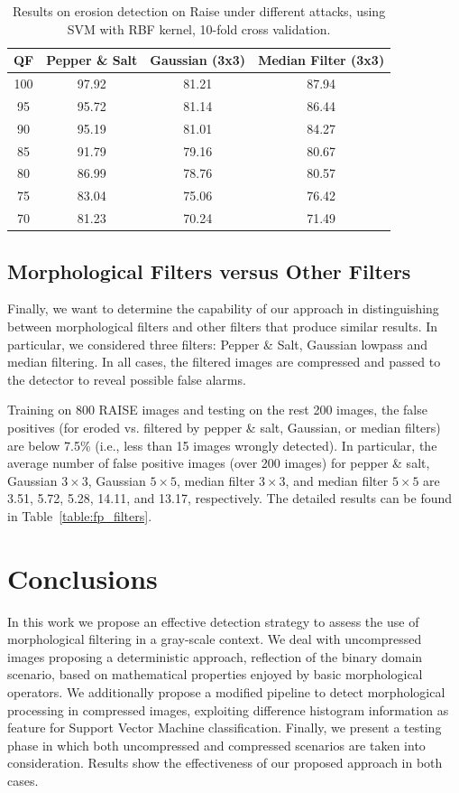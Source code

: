 \documentclass[review]{elsarticle}
\begin{document}
\begin{table}[h!]
	\centering
	\caption{Results on erosion detection on Raise under different attacks, using SVM with RBF kernel, 10-fold cross validation.}
	\label{table:attacks2}
	\begin{tabular}{c|ccc}
		\hline\hline
		\textbf{QF} & \textbf{Pepper \& Salt}&\textbf{Gaussian (3x3)}&\textbf{Median Filter (3x3)}\\
		\hline
		100&97.92&81.21&87.94\\
		95&95.72&81.14&86.44\\
		90&95.19&81.01&84.27\\
		85&91.79&79.16&80.67\\
		80&86.99&78.76&80.57\\
		75&83.04&75.06&76.42\\
		70&81.23&70.24&71.49\\
		\hline\hline	
	\end{tabular}
\end{table}

\subsection{Morphological Filters versus Other Filters }
\label{subsec:results_different_filters}

Finally, we want to determine the capability of our approach in distinguishing between morphological filters and other filters that produce similar results. In particular, we considered three filters: Pepper \& Salt, Gaussian lowpass and median filtering. In all cases, the filtered images are compressed and passed to the detector to reveal possible false alarms. 

Training on 800 RAISE images and testing on the rest 200 images, the false positives (for eroded vs. filtered by pepper \& salt, Gaussian, or median filters) are below 7.5\% (i.e., less than 15 images wrongly detected). In particular, the average number of false positive images (over 200 images) for pepper \& salt, Gaussian $3 \times 3$, Gaussian $5 \times 5$, median filter $3 \times 3$, and median filter $5 \times 5$ are 3.51, 5.72, 5.28, 14.11, and 13.17, respectively. The detailed results can be found in Table~\ref{table:fp_filters}. 


\section{Conclusions}
In this work we propose an effective detection strategy to assess the use of morphological filtering in a gray-scale context. We deal with uncompressed images proposing a deterministic approach, reflection of the binary domain scenario, based on mathematical properties enjoyed by basic morphological operators. We additionally propose a modified pipeline to detect morphological processing in compressed images, exploiting difference histogram information as feature for Support Vector Machine classification. Finally, we present a testing phase in which both uncompressed and compressed scenarios are taken into consideration. Results show the effectiveness of our proposed approach in both cases.  
 
\end{document}
